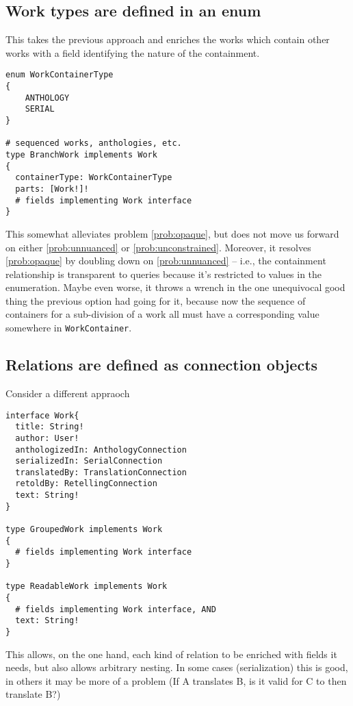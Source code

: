 \documentclass{amsart}
\theoremstyle{remark}
\begin{document}
\subsection{Work types are defined in an enum}
This takes the previous approach and enriches the works which contain other works with a field identifying the nature of the containment.
\begin{lstlisting}[frame=single,basicstyle=\small]
enum WorkContainerType
{
    ANTHOLOGY
    SERIAL
}

# sequenced works, anthologies, etc.
type BranchWork implements Work
{
  containerType: WorkContainerType
  parts: [Work!]!   
  # fields implementing Work interface
}
\end{lstlisting}
This somewhat alleviates problem \ref{prob:opaque}, but does not move us forward on either \ref{prob:unnuanced} or \ref{prob:unconstrained}. Moreover, it resolves \ref{prob:opaque} by doubling down on \ref{prob:unnuanced} -- i.e., the containment relationship is transparent to queries because it's restricted to values in the enumeration. Maybe even worse, it throws a wrench in the one unequivocal good thing the previous option had going for it, because now the sequence of containers for a sub-division of a work all must have a corresponding value somewhere in \lstinline|WorkContainer|. 

\subsection{Relations are defined as connection objects}
Consider a different appraoch
\begin{lstlisting}[frame=single,basicstyle=\small]
interface Work{
  title: String!
  author: User!
  anthologizedIn: AnthologyConnection
  serializedIn: SerialConnection
  translatedBy: TranslationConnection
  retoldBy: RetellingConnection
  text: String!
}

type GroupedWork implements Work
{
  # fields implementing Work interface
}

type ReadableWork implements Work
{
  # fields implementing Work interface, AND
  text: String!
}
\end{lstlisting}

This allows, on the one hand, each kind of relation to be enriched with fields it needs, but also allows arbitrary nesting. In some cases (serialization) this is good, in others it may be more of a problem (If A translates B, is it valid for C to then translate B?) 
\end{document}
